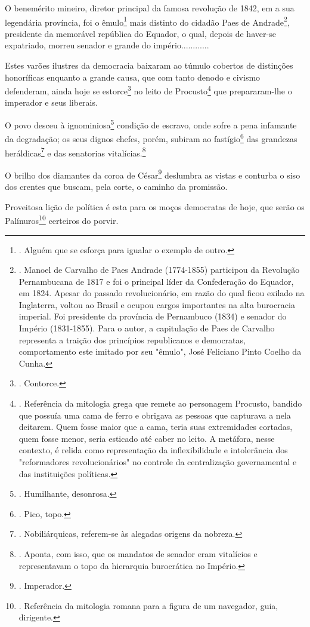 O benemérito mineiro, diretor principal da famosa revolução de 1842, em
a sua legendária província, foi o êmulo\footnote{. Alguém que se esforça
  para igualar o exemplo de outro.} mais distinto do cidadão Paes de
Andrade\footnote{. Manoel de Carvalho de Paes Andrade (1774-1855)
  participou da Revolução Pernambucana de 1817 e foi o principal líder
  da Confederação do Equador, em 1824. Apesar do passado revolucionário,
  em razão do qual ficou exilado na Inglaterra, voltou ao Brasil e
  ocupou cargos importantes na alta burocracia imperial. Foi presidente
  da província de Pernambuco (1834) e senador do Império (1831-1855).
  Para o autor, a capitulação de Paes de Carvalho representa a traição
  dos princípios republicanos e democratas, comportamento este imitado
  por seu "êmulo", José Feliciano Pinto Coelho da Cunha.}, presidente da
memorável república do Equador, o qual, depois de haver-se expatriado,
morreu senador e grande do império............

Estes varões ilustres da democracia baixaram ao túmulo cobertos de
distinções honoríficas enquanto a grande causa, que com tanto denodo e
civismo defenderam, ainda hoje se estorce\footnote{. Contorce.} no leito
de Procusto\footnote{. Referência da mitologia grega que remete ao
  personagem Procusto, bandido que possuía uma cama de ferro e obrigava
  as pessoas que capturava a nela deitarem. Quem fosse maior que a cama,
  teria suas extremidades cortadas, quem fosse menor, seria esticado até
  caber no leito. A metáfora, nesse contexto, é relida como
  representação da inflexibilidade e intolerância dos "reformadores
  revolucionários" no controle da centralização governamental e das
  instituições políticas.} que prepararam-lhe o imperador e seus
liberais.

O povo desceu à ignominiosa\footnote{. Humilhante, desonrosa.} condição
de escravo, onde sofre a pena infamante da degradação; os seus dignos
chefes, porém, subiram ao fastígio\footnote{. Pico, topo.} das grandezas
heráldicas\footnote{. Nobiliárquicas, referem-se às alegadas origens da
  nobreza.} e das senatorias vitalícias.\footnote{. Aponta, com isso,
  que os mandatos de senador eram vitalícios e representavam o topo da
  hierarquia burocrática no Império.}

O brilho dos diamantes da coroa de César\footnote{. Imperador.}
deslumbra as vistas e conturba o siso dos crentes que buscam, pela
corte, o caminho da promissão.

Proveitosa lição de política é esta para os moços democratas de hoje,
que serão os Palínuros\footnote{. Referência da mitologia romana para a
  figura de um navegador, guia, dirigente.} certeiros do porvir.

